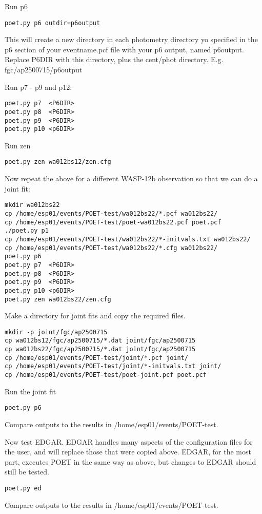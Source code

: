 \documentclass[letterpaper,12pt]{article}
\begin{document}
Run p6

\begin{verbatim}
poet.py p6 outdir=p6output
\end{verbatim}

This will create a new directory in each photometry directory yo
specified in the p6 section of your eventname.pcf file with your p6
output, named p6output. Replace P6DIR with this directory, plus the
cent/phot directory. E.g. fgc/ap2500715/p6output

Run p7 - p9 and p12:

\begin{verbatim}
poet.py p7  <P6DIR>
poet.py p8  <P6DIR>
poet.py p9  <P6DIR>
poet.py p10 <p6DIR>
\end{verbatim}

Run zen

\begin{verbatim}
poet.py zen wa012bs12/zen.cfg
\end{verbatim}

Now repeat the above for a different WASP-12b observation so that
we can do a joint fit:

\begin{verbatim}
mkdir wa012bs22
cp /home/esp01/events/POET-test/wa012bs22/*.pcf wa012bs22/
cp /home/esp01/events/POET-test/poet-wa012bs22.pcf poet.pcf
./poet.py p1
cp /home/esp01/events/POET-test/wa012bs22/*-initvals.txt wa012bs22/
cp /home/esp01/events/POET-test/wa012bs22/*.cfg wa012bs22/
poet.py p6
poet.py p7  <P6DIR>
poet.py p8  <P6DIR>
poet.py p9  <P6DIR>
poet.py p10 <p6DIR>
poet.py zen wa012bs22/zen.cfg
\end{verbatim}

Make a directory for joint fits and copy the required files.

\begin{verbatim}
mkdir -p joint/fgc/ap2500715
cp wa012bs12/fgc/ap2500715/*.dat joint/fgc/ap2500715
cp wa012bs22/fgc/ap2500715/*.dat joint/fgc/ap2500715
cp /home/esp01/events/POET-test/joint/*.pcf joint/
cp /home/esp01/events/POET-test/joint/*-initvals.txt joint/
cp /home/esp01/events/POET-test/poet-joint.pcf poet.pcf
\end{verbatim}

Run the joint fit

\begin{verbatim}
poet.py p6
\end{verbatim}

Compare outputs to the results in /home/esp01/events/POET-test.

Now test EDGAR. EDGAR handles many aspects of the configuration files
for the user, and will replace those that were copied above. EDGAR,
for the most part, executes POET in the same way as above, but changes
to EDGAR should still be tested.

\begin{verbatim}
poet.py ed
\end{verbatim}

Compare outputs to the results in /home/esp01/events/POET-test.
\end{document}
